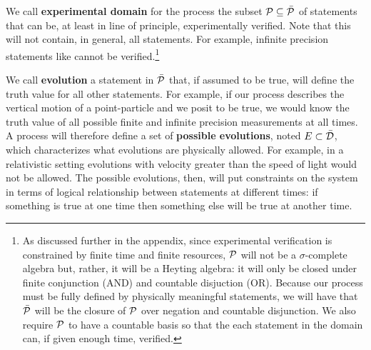 \documentclass[letterpaper]{article}
\begin{document}
We call \textbf{experimental domain} for the process the subset $\edomain[P] \subseteq \tdomain[P]$ of statements that can be, at least in line of principle, experimentally verified. Note that this will not contain, in general, all statements. For example, infinite precision statements like  cannot be verified.\footnote{As discussed further in the appendix, since experimental verification is constrained by finite time and finite resources, $\edomain[P]$ will not be a $\sigma$-complete algebra but, rather, it will be a Heyting algebra: it will only be closed under finite conjunction (AND) and countable disjuction (OR). Because our process must be fully defined by physically meaningful statements, we will have that $\tdomain[P]$ will be the closure of $\edomain[P]$ over negation and countable disjunction. We also require $\edomain[P]$ to have a countable basis so that the each statement in the domain can, if given enough time, verified.}

We call \textbf{evolution} a statement in $\tdomain[P]$ that, if assumed to be true, will define the truth value for all other statements. For example, if our process describes the vertical motion of a point-particle and we posit  to be true, we would know the truth value of all possible finite and infinite precision measurements at all times. A process will therefore define a set of \textbf{possible evolutions}, noted $E \subset \tdomain$, which characterizes what evolutions are physically allowed. For example, in a relativistic setting evolutions with velocity greater than the speed of light would not be allowed. The possible evolutions, then, will put constraints on the system in terms of logical relationship between statements at different times: if something is true at one time then something else will be true at another time.
\end{document}

